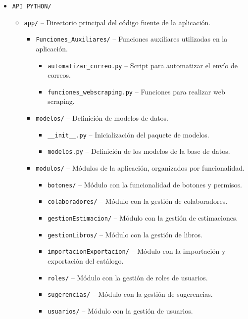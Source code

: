 \begin{itemize}
    \item \texttt{API PYTHON/}
    \begin{itemize}
        \item \texttt{app/} -- Directorio principal del código fuente de la aplicación.
        \begin{itemize}
            \item \texttt{Funciones\_Auxiliares/} -- Funciones auxiliares utilizadas en la aplicación.
            \begin{itemize}
                \item \texttt{automatizar\_correo.py} -- Script para automatizar el envío de correos.
                \item \texttt{funciones\_webscraping.py} -- Funciones para realizar web scraping.
            \end{itemize}
            \item \texttt{modelos/} -- Definición de modelos de datos.
            \begin{itemize}
                \item \texttt{\_\_init\_\_.py} -- Inicialización del paquete de modelos.
                \item \texttt{modelos.py} -- Definición de los modelos de la base de datos.
            \end{itemize}
            \item \texttt{modulos/} -- Módulos de la aplicación, organizados por funcionalidad.
            \begin{itemize}
                \item \texttt{botones/} -- Módulo con la funcionalidad de botones y permisos.
                \item \texttt{colaboradores/} -- Módulo con la gestión de colaboradores.
                \item \texttt{gestionEstimacion/} -- Módulo con la gestión de estimaciones.
                \item \texttt{gestionLibros/} -- Módulo con la gestión de libros.
                \item \texttt{importacionExportacion/} -- Módulo con la importación y exportación del catálogo.
                \item \texttt{roles/} -- Módulo con la gestión de roles de usuarios.
                \item \texttt{sugerencias/} -- Módulo con la gestión de sugerencias.
                \item \texttt{usuarios/} -- Módulo con la gestión de usuarios.

\end{itemize}
\end{itemize}
\end{itemize}
\end{itemize}
